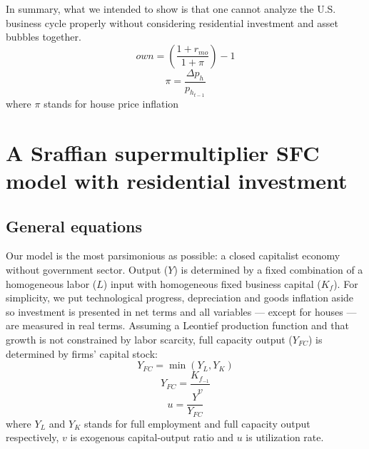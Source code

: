 \documentclass[11pt]{article}
\begin{document}
In summary, what we intended to show is that one cannot analyze the U.S. business cycle properly without considering residential investment and asset bubbles together.
\begin{equation}
\label{_own}
own = \left(\frac{1+r_{mo}}{1+\pi}\right) -1
\end{equation}
$$
\pi = \frac{\Delta p_h}{p_{h_{t-1}}}
$$
where \(\pi\) stands for house price inflation


\section{A Sraffian supermultiplier SFC model with residential investment}
\label{sec:orged73801}
\label{sec:Model}
\subsection{General equations}
\label{sec:orgdc8e4b8}

Our model is the most parsimonious as possible: a closed capitalist economy without government sector. Output (\(Y\)) is determined by  a fixed combination of a homogeneous labor (\(L\)) input with homogeneous fixed business capital (\(K_f\)). 
For simplicity, we put technological progress, depreciation and goods inflation aside so investment is presented in net terms and all variables --- except for houses --- are measured in real terms.
Assuming a Leontief production function and that growth is not constrained by labor scarcity, full capacity output (\(Y_{FC}\)) is
determined by firms' capital stock:
\begin{equation}
\label{_Leontieff}
    Y_{FC} = \min (Y_L, Y_K)
\end{equation}
\begin{equation}
\label{_YFC}
    Y_{FC} = \frac{K_{f_{-1}}}{v}
\end{equation}
\begin{equation}
\label{_u}
    u = \frac{Y}{Y_{FC}}
\end{equation}
where \(Y_L\) and \(Y_K\) stands for full employment and full capacity output respectively, \(v\) is exogenous capital-output ratio and \(u\) is utilization rate.
\end{document}
